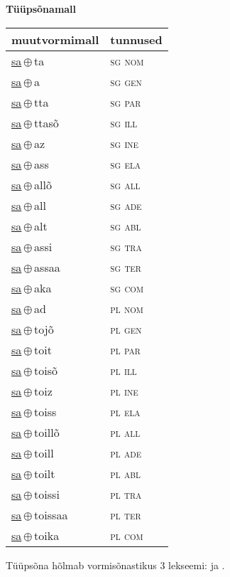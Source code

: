 

\vspace{3.5em}
\noindent \begin{minipage}{\textwidth}
\noindent \textbf{Tüüpsõnamall \,}\\

\begin{sideways}
\begin{tabular}{l l}
muutvormimall & tunnused \\
\hline
\underline{sa}\,$\oplus$\,ta & \textsc{ sg nom } \\
\underline{sa}\,$\oplus$\,a & \textsc{ sg gen } \\
\underline{sa}\,$\oplus$\,tta & \textsc{ sg par } \\
\underline{sa}\,$\oplus$\,ttasõ & \textsc{ sg ill } \\
\underline{sa}\,$\oplus$\,az & \textsc{ sg ine } \\
\underline{sa}\,$\oplus$\,ass & \textsc{ sg ela } \\
\underline{sa}\,$\oplus$\,allõ & \textsc{ sg all } \\
\underline{sa}\,$\oplus$\,all & \textsc{ sg ade } \\
\underline{sa}\,$\oplus$\,alt & \textsc{ sg abl } \\
\underline{sa}\,$\oplus$\,assi & \textsc{ sg tra } \\
\underline{sa}\,$\oplus$\,assaa & \textsc{ sg ter } \\
\underline{sa}\,$\oplus$\,aka & \textsc{ sg com } \\
\underline{sa}\,$\oplus$\,ad & \textsc{ pl nom } \\
\underline{sa}\,$\oplus$\,tojõ & \textsc{ pl gen } \\
\underline{sa}\,$\oplus$\,toit & \textsc{ pl par } \\
\underline{sa}\,$\oplus$\,toisõ & \textsc{ pl ill } \\
\underline{sa}\,$\oplus$\,toiz & \textsc{ pl ine } \\
\underline{sa}\,$\oplus$\,toiss & \textsc{ pl ela } \\
\underline{sa}\,$\oplus$\,toillõ & \textsc{ pl all } \\
\underline{sa}\,$\oplus$\,toill & \textsc{ pl ade } \\
\underline{sa}\,$\oplus$\,toilt & \textsc{ pl abl } \\
\underline{sa}\,$\oplus$\,toissi & \textsc{ pl tra } \\
\underline{sa}\,$\oplus$\,toissaa & \textsc{ pl ter } \\
\underline{sa}\,$\oplus$\,toika & \textsc{ pl com } \\
\end{tabular}
\end{sideways}
\label{tab:tüüpsõnamall-sata}

\end{minipage}

 
\vspace{1em}
\noindent Tüüpsõna hõlmab vormisõnastikus 3 lekseemi:  ja .
